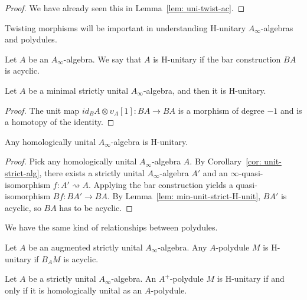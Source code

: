 \documentclass[../thesis.tex]{subfiles}
\begin{document}
            \begin{proof}
                We have already seen this in Lemma~\ref{lem: uni-twist-ac}.
            \end{proof}

            Twisting morphisms will be important in understanding H-unitary $A_\infty$-algebras and polydules.

            \begin{definition}
                Let $A$ be an $A_\infty$-algebra. We say that $A$ is H-unitary if the bar construction $BA$ is acyclic.
            \end{definition}

            \begin{lemma}\label{lem: min-unit-strict-H-unit}
                Let $A$ be a minimal strictly unital $A_\infty$-algebra, and then it is H-unitary.
            \end{lemma}

            \begin{proof}
                The unit map $id_BA \otimes \upsilon_A[1]: BA \rightarrow BA$ is a morphism of degree $-1$ and is a homotopy of the identity.
            \end{proof}

            \begin{corollary}\label{cor: hu-to-H-u}
                Any homologically unital $A_\infty$-algebra is H-unitary. 
            \end{corollary}

            \begin{proof}
                Pick any homologically unital $A_\infty$-algebra $A$. By Corollary~\ref{cor: unit-strict-alg}, there exists a strictly unital $A_\infty$-algebra $A'$ and an $\infty$-quasi-isomorphism $f: A' \rightsquigarrow A$. Applying the bar construction yields a quasi-isomorphism $Bf: BA' \rightarrow BA$. By Lemma~\ref{lem: min-unit-strict-H-unit}, $BA'$ is acyclic, so $BA$ has to be acyclic.
            \end{proof}

            We have the same kind of relationships between polydules.

            \begin{definition}
                Let $A$ be an augmented strictly unital $A_\infty$-algebra. Any $A$-polydule $M$ is H-unitary if $B_AM$ is acyclic.
            \end{definition}

            \begin{lemma}\label{lem: H-u-is-hu}
                Let $A$ be a strictly unital $A_\infty$-algebra. An $A^+$-polydule $M$ is H-unitary if and only if it is homologically unital as an $A$-polydule.
            \end{lemma}
\end{document}
